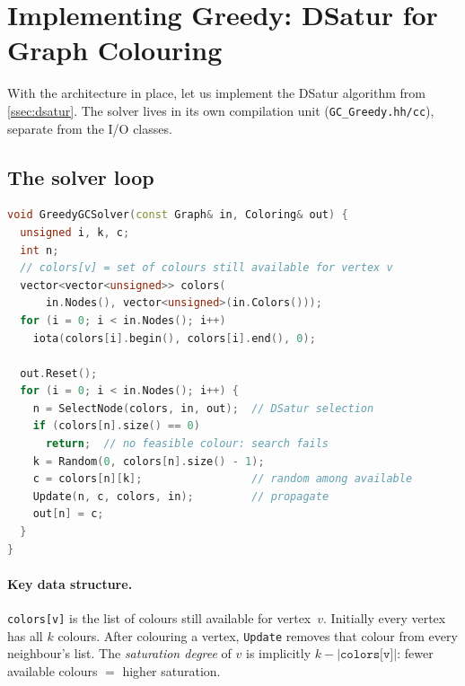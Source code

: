 \section{Implementing Greedy: DSatur for Graph Colouring}
\label{sec:gc-greedy-impl}

With the architecture in place, let us implement the DSatur
algorithm from \cref{ssec:dsatur}.
The solver lives in its own compilation unit
(\texttt{GC\_Greedy.hh/cc}), separate from the I/O classes.

\subsection{The solver loop}
\label{ssec:gc-greedy-loop}

\begin{lstlisting}[language=C++,
  caption={DSatur main loop (\texttt{GC\_Greedy.cc}).},
  label={lst:gc-greedy-loop}]
void GreedyGCSolver(const Graph& in, Coloring& out) {
  unsigned i, k, c;
  int n;
  // colors[v] = set of colours still available for vertex v
  vector<vector<unsigned>> colors(
      in.Nodes(), vector<unsigned>(in.Colors()));
  for (i = 0; i < in.Nodes(); i++)
    iota(colors[i].begin(), colors[i].end(), 0);

  out.Reset();
  for (i = 0; i < in.Nodes(); i++) {
    n = SelectNode(colors, in, out);  // DSatur selection
    if (colors[n].size() == 0)
      return;  // no feasible colour: search fails
    k = Random(0, colors[n].size() - 1);
    c = colors[n][k];                 // random among available
    Update(n, c, colors, in);         // propagate
    out[n] = c;
  }
}
\end{lstlisting}

\paragraph{Key data structure.}
\texttt{colors[v]} is the list of colours still available for
vertex~$v$.  Initially every vertex has all $k$ colours.
After colouring a vertex, \texttt{Update} removes that colour
from every neighbour's list.
The \emph{saturation degree} of $v$ is implicitly
$k - |\texttt{colors[v]}|$: fewer available colours $=$ higher
saturation.

